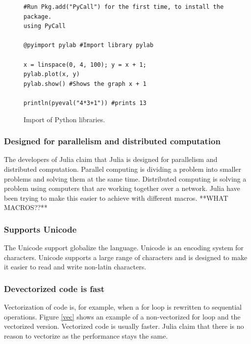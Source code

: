 \documentclass[a4paper, 11pt, titlepage]{article}
\begin{document}
\begin{figure}[H]
		\centering
		\begin{lstlisting}
#Run Pkg.add("PyCall") for the first time, to install the package.
using PyCall

@pyimport pylab #Import library pylab

x = linspace(0, 4, 100); y = x + 1;
pylab.plot(x, y)
pylab.show() #Shows the graph x + 1

println(pyeval("4*3+1")) #prints 13
		\end{lstlisting}
		\caption{Import of Python libraries.}
\end{figure}

\subsubsection{Designed for parallelism and distributed computation}
The developers of Julia claim that Julia is designed for parallelism and distributed computation. Parallel computing is dividing a problem into smaller problems and solving them at the same time. Distributed computing is solving a problem using computers that are working together over a network. Julia have been trying to make this easier to achieve with different macros.
**WHAT MACROS??**

\subsubsection{Supports Unicode}
The Unicode support globalize the language. Unicode is an encoding system for characters. Unicode supports a large range of characters and is designed to make it easier to read and write non-latin characters.

\subsubsection{Devectorized code is fast}
Vectorization of code is, for example, when a for loop is rewritten to sequential operations. Figure \ref{vec} shows an example of a non-vectorized for loop and the vectorized version. Vectorized code is usually faster. Julia claim that there is no reason to vectorize as the performance stays the same.
\end{document}
